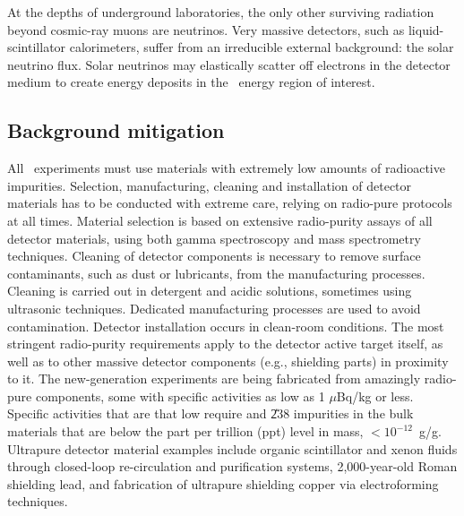 At the depths of underground laboratories, the only other surviving radiation beyond cosmic-ray muons are neutrinos. Very massive detectors, such as liquid-scintillator calorimeters, suffer from an irreducible external background: the solar neutrino flux. Solar neutrinos may elastically scatter off electrons in the detector medium to create energy deposits in the \bbonu\ energy region of interest.


\subsection{Background mitigation} \label{subsec:bgrmitigation}

%

All \bbonu\ experiments must use materials with extremely low amounts of radioactive impurities. Selection, manufacturing, cleaning and installation of detector materials has to be conducted with extreme care, relying on radio-pure protocols at all times. Material selection is based on extensive radio-purity assays of all detector materials, using both gamma spectroscopy and mass spectrometry techniques. Cleaning of detector components is necessary to remove surface contaminants, such as dust or lubricants, from the manufacturing processes. Cleaning is carried out in detergent and acidic solutions, sometimes using ultrasonic techniques. Dedicated manufacturing processes are used to avoid contamination. Detector installation occurs in clean-room conditions. The most stringent radio-purity requirements apply to the detector active target itself, as well as to other massive detector components (e.g., shielding parts) in proximity to it. The new-generation experiments are being fabricated from amazingly radio-pure components, some with specific activities as low as 1 $\mu$Bq/kg or less. Specific activities that are that low require  and \U{238} impurities in the bulk materials that are below the part per trillion (ppt) level in mass, $<10^{-12}$~g/g. Ultrapure detector material examples include organic scintillator and xenon fluids through closed-loop re-circulation and purification systems, 2,000-year-old Roman shielding lead, and fabrication of ultrapure shielding copper via electroforming techniques.

